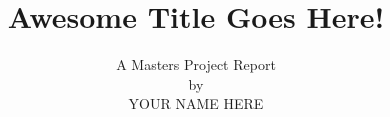 \documentclass[onecolumn]{article}
\begin{document}
\begin{sloppypar}

\title{Awesome Title Goes Here!}


\author{A Masters Project Report\\
by\\
YOUR NAME HERE}

\date{}

\maketitle

%
%







%
%




\end{sloppypar}
\end{document}
